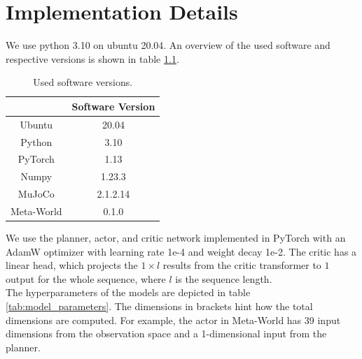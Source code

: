 \chapter{Implementation Details}
\label{chapter:DetailedDescriptions}\label{appendix}
We use python 3.10 on ubuntu 20.04. An overview of the used software and respective versions is shown in table \ref{tab:software_versions}. 

\begin{table}[H]
    \centering
    \begin{tabular}{|c|c|}
    \hline
    {} & Software Version \\
    \hline\hline
    Ubuntu & 20.04 \\
    \hline
    Python & 3.10 \\
    \hline
    PyTorch & 1.13\\
    \hline
    Numpy & 1.23.3 \\
    \hline
    MuJoCo & 2.1.2.14\\
    \hline
    Meta-World & 0.1.0\\
    \hline
    \end{tabular}
    \caption{Used software versions.}
    \label{tab:software_versions}
\end{table}

We use the planner, actor, and critic network implemented in PyTorch with an AdamW optimizer with learning rate 1e-4 and weight decay 1e-2. The 
critic has a linear head, which projects the $1 \times l$ results from the critic transformer to $1$ output for the whole sequence, where $l$ is the 
sequence length. \\

The hyperparameters of the models are depicted in table \ref{tab:model_parameters}. The dimensions in brackets hint how the total dimensions are 
computed. For example, the actor in Meta-World has 39 input dimensions from the observation space and a 1-dimensional input from the planner.

